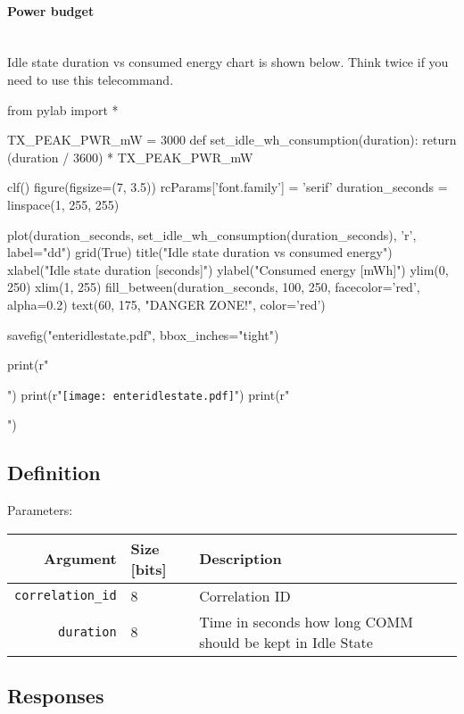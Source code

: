 \paragraph{Power budget} \mbox{} \\
Idle state duration vs consumed energy chart is shown below. Think twice if you need to use this telecommand.

\begin{pycode}
from pylab import *

TX_PEAK_PWR_mW = 3000
def set_idle_wh_consumption(duration):
    return (duration / 3600) * TX_PEAK_PWR_mW

clf()
figure(figsize=(7, 3.5))
rcParams['font.family'] = 'serif'
duration_seconds = linspace(1, 255, 255)

plot(duration_seconds, set_idle_wh_consumption(duration_seconds), 'r', label="dd")
grid(True)
title("Idle state duration vs consumed energy")
xlabel("Idle state duration [seconds]")
ylabel("Consumed energy [mWh]")
ylim(0, 250)
xlim(1, 255)
fill_between(duration_seconds, 100, 250, facecolor='red', alpha=0.2)
text(60, 175, "DANGER ZONE!", color='red')

savefig("enteridlestate.pdf", bbox_inches="tight")

print(r"\begin{center}")
print(r"\texttt{[image: enteridlestate.pdf]}")
print(r"\end{center}")
\end{pycode}

\subsection{Definition}

Parameters: 

\begin{tabular}{r | l | l}
	Argument                    & Size [bits] & Description \\
	\hline
	\texttt{correlation\_id}    & 8 		  &	Correlation ID \\
	\texttt{duration}			& 8 		  & Time in seconds how long COMM should be kept in Idle State
\end{tabular}

\subsection{Responses}


